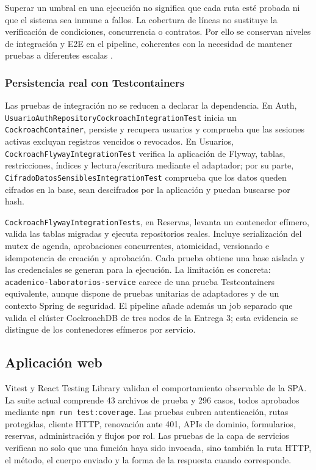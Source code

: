 Superar un umbral en una ejecución no significa que cada ruta esté probada ni
que el sistema sea inmune a fallos. La cobertura de líneas no sustituye la
verificación de condiciones,
concurrencia o contratos. Por ello se conservan niveles de integración y E2E en
el pipeline, coherentes con la necesidad de mantener pruebas a diferentes
escalas \cite{winters2020softwareengineeringgoogle}.

\subsubsection{Persistencia real con Testcontainers}

Las pruebas de integración no se reducen a declarar la dependencia. En Auth,
\texttt{UsuarioAuthRepositoryCockroachIntegrationTest} inicia un
\texttt{CockroachContainer}, persiste y recupera usuarios y comprueba que las
sesiones activas excluyan registros vencidos o revocados. En Usuarios,
\texttt{CockroachFlywayIntegrationTest} verifica la aplicación de Flyway,
tablas, restricciones, índices y lectura/escritura mediante el adaptador; por
su parte, \texttt{CifradoDatosSensiblesIntegrationTest} comprueba que los datos
queden cifrados en la base, sean descifrados por la aplicación y puedan buscarse
por hash.

\texttt{CockroachFlywayIntegrationTests}, en Reservas, levanta un contenedor
efímero, valida las tablas migradas y ejecuta repositorios reales. Incluye
serialización del mutex de agenda, aprobaciones concurrentes, atomicidad,
versionado e idempotencia de creación y aprobación. Cada prueba obtiene una base
aislada y las credenciales se generan para la ejecución. La limitación es
concreta: \texttt{academico-laboratorios-service} carece de una prueba
Testcontainers equivalente, aunque dispone de pruebas unitarias de adaptadores y
de un contexto Spring de seguridad. El pipeline añade además un job separado que
valida el clúster CockroachDB de tres nodos de la Entrega 3; esta evidencia se
distingue de los contenedores efímeros por servicio.

\subsection{Aplicación web}
\label{subsec:pruebas-web}

Vitest y React Testing Library validan el comportamiento observable de la SPA.
La suite actual comprende 43 archivos de prueba y 296 casos, todos aprobados
mediante \texttt{npm run test:coverage}. Las pruebas cubren autenticación,
rutas protegidas, cliente HTTP, renovación ante 401, APIs de dominio,
formularios, reservas, administración y flujos por rol. Las pruebas de la capa
de servicios verifican no solo que una función haya sido invocada, sino también
la ruta HTTP, el método, el cuerpo enviado y la forma de la respuesta cuando
corresponde.

